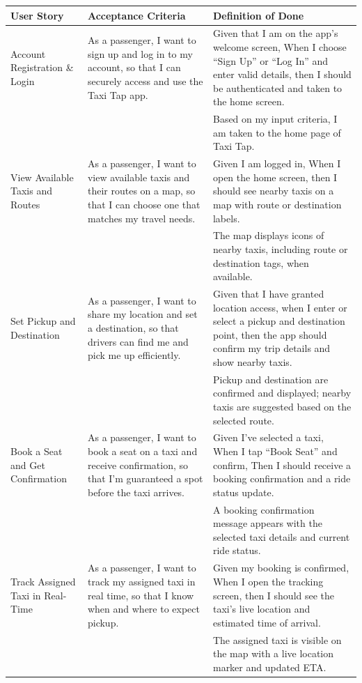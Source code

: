 \documentclass[a4paper,12pt]{article}
\begin{document}
\begin{longtable}{|p{4cm}|p{6cm}|p{5cm}|}
\hline
\textbf{User Story} & \textbf{Acceptance Criteria} & \textbf{Definition of Done} \\
\hline
Account Registration \& Login & As a passenger, I want to sign up and log in to my account, so that I can securely access and use the Taxi Tap app. & Given that I am on the app’s welcome screen, When I choose “Sign Up” or “Log In” and enter valid details, then I should be authenticated and taken to the home screen. \\
& & Based on my input criteria, I am taken to the home page of Taxi Tap. \\
\hline
View Available Taxis and Routes & As a passenger, I want to view available taxis and their routes on a map, so that I can choose one that matches my travel needs. & Given I am logged in, When I open the home screen, then I should see nearby taxis on a map with route or destination labels. \\
& & The map displays icons of nearby taxis, including route or destination tags, when available. \\
\hline
Set Pickup and Destination & As a passenger, I want to share my location and set a destination, so that drivers can find me and pick me up efficiently. & Given that I have granted location access, when I enter or select a pickup and destination point, then the app should confirm my trip details and show nearby taxis. \\
& & Pickup and destination are confirmed and displayed; nearby taxis are suggested based on the selected route. \\
\hline
Book a Seat and Get Confirmation & As a passenger, I want to book a seat on a taxi and receive confirmation, so that I’m guaranteed a spot before the taxi arrives. & Given I’ve selected a taxi, When I tap “Book Seat” and confirm, Then I should receive a booking confirmation and a ride status update. \\
& & A booking confirmation message appears with the selected taxi details and current ride status. \\
\hline
Track Assigned Taxi in Real-Time & As a passenger, I want to track my assigned taxi in real time, so that I know when and where to expect pickup. & Given my booking is confirmed, When I open the tracking screen, then I should see the taxi’s live location and estimated time of arrival. \\
& & The assigned taxi is visible on the map with a live location marker and updated ETA. \\

\end{longtable}
\end{document}

